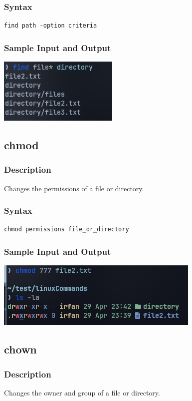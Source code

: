 \subsubsection{Syntax}
\begin{verbatim}
find path -option criteria
\end{verbatim}

\subsubsection{Sample Input and Output}
\includegraphics[]{Cycle_1//Outputs/find.png}


\subsection{chmod}
\subsubsection{Description}
Changes the permissions of a file or directory.

\subsubsection{Syntax}
\begin{verbatim}
chmod permissions file_or_directory
\end{verbatim}

\subsubsection{Sample Input and Output}
\includegraphics[width=0.5\linewidth]{Cycle_1//Outputs/chmod.png}


\subsection{chown}
\subsubsection{Description}
Changes the owner and group of a file or directory.

